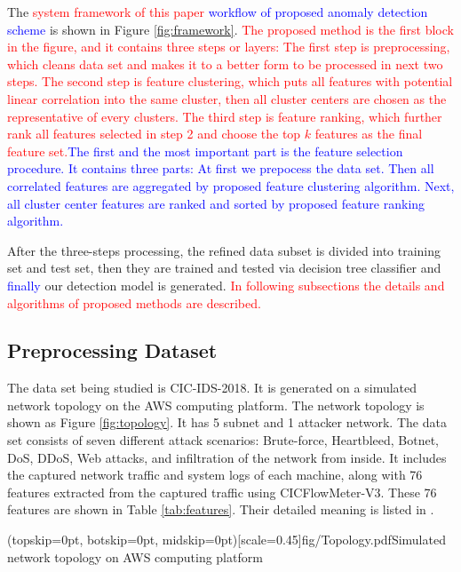 \documentclass{ieeeaccess}
\theoremstyle{definition}
\newcommand{\change}[2]{\textcolor{red}{#1}\textcolor{blue}{#2}}
\begin{document}
The \change{system framework of this paper }{workflow of proposed anomaly detection scheme} is shown in Figure \ref{fig:framework}.
\change{The proposed method is the first block in the figure, and it contains three steps or layers: The first step is preprocessing, which cleans data set and makes it to a better form to be processed in next two steps. The second step is feature clustering, which puts all features with potential linear correlation into the same cluster, then all cluster centers are chosen as the representative of every clusters. The third step is feature ranking, which further rank all features selected in step 2 and choose the top $k$ features as the final feature set.}{The first and the most important part is the feature selection procedure. It contains three parts: At first we prepocess the data set. Then all correlated features are aggregated by proposed feature clustering algorithm. Next, all cluster center features are ranked and sorted by proposed feature ranking algorithm.}

After the three-steps processing, the refined data subset is divided into training set and test set, then they are trained and tested via decision tree classifier and \change{}{finally} our detection model is generated. \change{In following subsections the details and algorithms of proposed methods are described.}{}

\subsection{Preprocessing Dataset}

The data set being studied is CIC-IDS-2018\cite{cic2018}.
It is generated on a simulated network topology on the AWS computing platform. The network topology is shown as Figure \ref{fig:topology}. It has 5 subnet and 1 attacker network.
The data set consists of seven different attack scenarios: Brute-force, Heartbleed, Botnet, DoS, DDoS, Web attacks, and infiltration of the network from inside. It includes the captured network traffic and system logs of each machine, along with 76 features extracted from the captured traffic using CICFlowMeter-V3\cite{cicflowmeter}. These 76 features are shown in Table \ref{tab:features}. Their detailed meaning is listed in \cite{cic2018}.

\Figure[!htpb](topskip=0pt, botskip=0pt, midskip=0pt)[scale=0.45]{fig/Topology.pdf}{Simulated network topology on AWS computing platform\label{fig:topology}}
\end{document}

